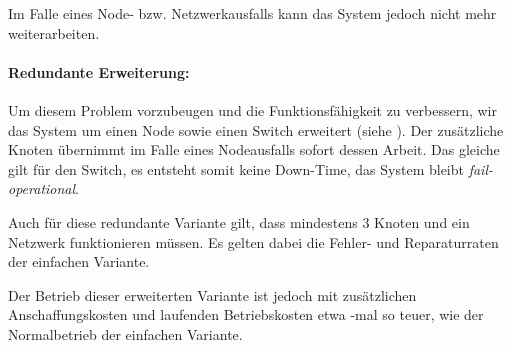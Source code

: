 \documentclass[
            a4paper
            ]{scrartcl}%
\newcommand{\printCostFactor}{\pgfmathparse{\costFactor}\pgfmathprintnumber[fixed,
precision=1]{\pgfmathresult}}
\begin{document}
Im Falle eines Node- bzw. Netzwerkausfalls kann das System jedoch nicht mehr weiterarbeiten.

\paragraph{Redundante Erweiterung:}
Um diesem Problem vorzubeugen und die Funktionsfähigkeit zu verbessern, wir das System um einen Node sowie einen Switch erweitert (siehe ). Der zusätzliche Knoten übernimmt im Falle eines Nodeausfalls sofort dessen Arbeit. Das gleiche gilt für den Switch, es entsteht somit keine Down-Time, das System bleibt \emph{fail-operational}.

Auch für diese redundante Variante gilt, dass mindestens 3 Knoten und ein Netzwerk funktionieren
müssen. Es gelten dabei die Fehler- und Reparaturraten der einfachen Variante.

Der Betrieb dieser erweiterten Variante ist jedoch mit zusätzlichen
Anschaffungskosten und laufenden Betriebskosten etwa \printCostFactor-mal so
teuer, wie der Normalbetrieb der einfachen Variante.
\end{document}
